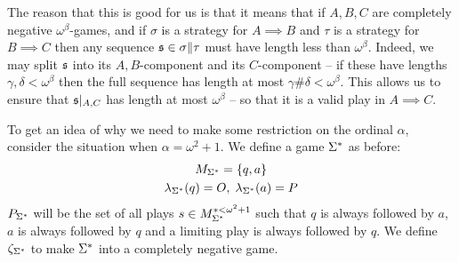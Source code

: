\documentclass[11pt]{article} %
\begin{document}
The reason that this is good for us is that it means that if $A,B,C$ are completely negative $\omega^\beta$-games, and if $\sigma$ is a strategy for $A\implies B$ and $\tau$ is a strategy for $B\implies C$ then any sequence $\mathfrak s\in\sigma\|\tau$ must have length less than $\omega^\beta$.  Indeed, we may split $\mathfrak s$ into its $A,B$-component and its $C$-component -- if these have lengths $\gamma,\delta<\omega^\beta$ then the full sequence has length at most $\gamma\#\delta<\omega^\beta$.  This allows us to ensure that $\mathfrak s\vert_{A,C}$ has length at most $\omega^\beta$ -- so that it is a valid play in $A\implies C$.

To get an idea of why we need to make some restriction on the ordinal $\alpha$, consider the situation when $\alpha=\omega^2+1$.  We define a game ${\Sigma^*}$ as before:
\begin{gather*}
  M_{{\Sigma^*}} = \{q,a\} \\
  \lambda_{{\Sigma^*}}(q) = O,\;\lambda_{{\Sigma^*}}(a)=P \\
\end{gather*}
$P_{\Sigma^*}$ will be the set of all plays $s\in M_{\Sigma^*}^{*<\omega^2+1}$ such that $q$ is always followed by $a$, $a$ is always followed by $q$ and a limiting play is always followed by $q$.  We define $\zeta_{\Sigma^*}$ to make ${\Sigma^*}$ into a completely negative game.  
\end{document}
